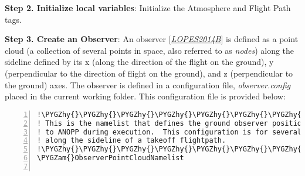 \documentclass[letterpaper,10pt,english]{sphinxmanual}
\def\PYGZam{\char`\&}
\def\PYGZhy{\char`\-}
\begin{document}
\textbf{Step 2. Initialize local variables}: Initialize the Atmosphere and Flight Path tags.

\textbf{Step 3. Create an Observer}: An observer {[}{\hyperref[usage:lopes2014b]{\emph{LOPES2014B}}}{]} is defined as a point cloud (a collection of several points in space, also referred to as \emph{nodes}) along the sideline defined by its x (along the direction of the flight on the ground), y (perpendicular to the direction of flight on the ground), and z (perpendicular to the ground) axes. The observer is defined in a configuration file, \emph{observer.config} placed in the current working folder.  This configuration file is provided below:

\begin{Verbatim}[commandchars=\\\{\},numbers=left,firstnumber=1,stepnumber=1]
!\PYGZhy{}\PYGZhy{}\PYGZhy{}\PYGZhy{}\PYGZhy{}\PYGZhy{}\PYGZhy{}\PYGZhy{}\PYGZhy{}\PYGZhy{}\PYGZhy{}\PYGZhy{}\PYGZhy{}\PYGZhy{}\PYGZhy{}\PYGZhy{}\PYGZhy{}\PYGZhy{}\PYGZhy{}\PYGZhy{}\PYGZhy{}\PYGZhy{}\PYGZhy{}\PYGZhy{}\PYGZhy{}\PYGZhy{}\PYGZhy{}\PYGZhy{}\PYGZhy{}\PYGZhy{}\PYGZhy{}\PYGZhy{}\PYGZhy{}\PYGZhy{}\PYGZhy{}\PYGZhy{}\PYGZhy{}\PYGZhy{}\PYGZhy{}\PYGZhy{}\PYGZhy{}\PYGZhy{}\PYGZhy{}\PYGZhy{}\PYGZhy{}\PYGZhy{}\PYGZhy{}\PYGZhy{}\PYGZhy{}\PYGZhy{}\PYGZhy{}\PYGZhy{}\PYGZhy{}\PYGZhy{}\PYGZhy{}\PYGZhy{}\PYGZhy{}\PYGZhy{}\PYGZhy{}\PYGZhy{}\PYGZhy{}\PYGZhy{}\PYGZhy{}\PYGZhy{}\PYGZhy{}\PYGZhy{}\PYGZhy{}\PYGZhy{}\PYGZhy{}\PYGZhy{}\PYGZhy{}\PYGZhy{}\PYGZhy{}\PYGZhy{}\PYGZhy{}\PYGZhy{}\PYGZhy{}\PYGZhy{}\PYGZhy{}\PYGZhy{}\PYGZhy{}\PYGZhy{}\PYGZhy{}\PYGZhy{}
! This is the namelist that defines the ground observer positions that will be passed 
! to ANOPP during execution.  This configuration is for several observer positions 
! along the sideline of a takeoff flightpath.
!\PYGZhy{}\PYGZhy{}\PYGZhy{}\PYGZhy{}\PYGZhy{}\PYGZhy{}\PYGZhy{}\PYGZhy{}\PYGZhy{}\PYGZhy{}\PYGZhy{}\PYGZhy{}\PYGZhy{}\PYGZhy{}\PYGZhy{}\PYGZhy{}\PYGZhy{}\PYGZhy{}\PYGZhy{}\PYGZhy{}\PYGZhy{}\PYGZhy{}\PYGZhy{}\PYGZhy{}\PYGZhy{}\PYGZhy{}\PYGZhy{}\PYGZhy{}\PYGZhy{}\PYGZhy{}\PYGZhy{}\PYGZhy{}\PYGZhy{}\PYGZhy{}\PYGZhy{}\PYGZhy{}\PYGZhy{}\PYGZhy{}\PYGZhy{}\PYGZhy{}\PYGZhy{}\PYGZhy{}\PYGZhy{}\PYGZhy{}\PYGZhy{}\PYGZhy{}\PYGZhy{}\PYGZhy{}\PYGZhy{}\PYGZhy{}\PYGZhy{}\PYGZhy{}\PYGZhy{}\PYGZhy{}\PYGZhy{}\PYGZhy{}\PYGZhy{}\PYGZhy{}\PYGZhy{}\PYGZhy{}\PYGZhy{}\PYGZhy{}\PYGZhy{}\PYGZhy{}\PYGZhy{}\PYGZhy{}\PYGZhy{}\PYGZhy{}\PYGZhy{}\PYGZhy{}\PYGZhy{}\PYGZhy{}\PYGZhy{}\PYGZhy{}\PYGZhy{}\PYGZhy{}\PYGZhy{}\PYGZhy{}\PYGZhy{}\PYGZhy{}\PYGZhy{}\PYGZhy{}\PYGZhy{}\PYGZhy{}
\PYGZam{}ObserverPointCloudNamelist
 

\end{Verbatim}
\end{document}
